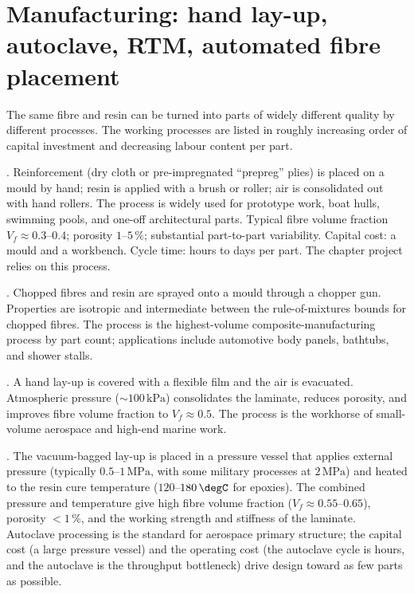 \section{Manufacturing: hand lay-up, autoclave, RTM, automated fibre placement}

The same fibre and resin can be turned into parts of widely different
quality by different processes. The working processes are listed in
roughly increasing order of capital investment and decreasing labour
content per part.

. Reinforcement (dry cloth or pre-impregnated
``prepreg'' plies) is placed on a mould by hand; resin is applied with
a brush or roller; air is consolidated out with hand rollers. The
process is widely used for prototype work, boat hulls, swimming pools,
and one-off architectural parts. Typical fibre volume fraction $V_f
\approx 0.3$--$0.4$; porosity $1$--$5\,\%$; substantial part-to-part
variability. Capital cost: a mould and a workbench. Cycle time: hours
to days per part. The chapter project relies on this process.

. Chopped fibres and resin are sprayed onto a mould
through a chopper gun. Properties are isotropic and intermediate
between the rule-of-mixtures bounds for chopped fibres. The process is
the highest-volume composite-manufacturing process by part count;
applications include automotive body panels, bathtubs, and shower
stalls.

. A hand lay-up is covered with a flexible
film and the air is evacuated. Atmospheric pressure ($\sim 100\,
\text{kPa}$) consolidates the laminate, reduces porosity, and
improves fibre volume fraction to $V_f \approx 0.5$. The process is
the workhorse of small-volume aerospace and high-end marine work.

. The vacuum-bagged lay-up is placed in
a pressure vessel that applies external pressure (typically $0.5$--$1\,
\text{MPa}$, with some military processes at $2\,\text{MPa}$) and
heated to the resin cure temperature ($120$--$180\,\degC$ for
epoxies). The combined pressure and temperature give high fibre
volume fraction ($V_f \approx 0.55$--$0.65$), porosity $< 1\,\%$, and
the working strength and stiffness of the laminate. Autoclave
processing is the standard for aerospace primary structure; the
capital cost (a large pressure vessel) and the operating cost (the
autoclave cycle is hours, and the autoclave is the throughput
bottleneck) drive design toward as few parts as possible.

